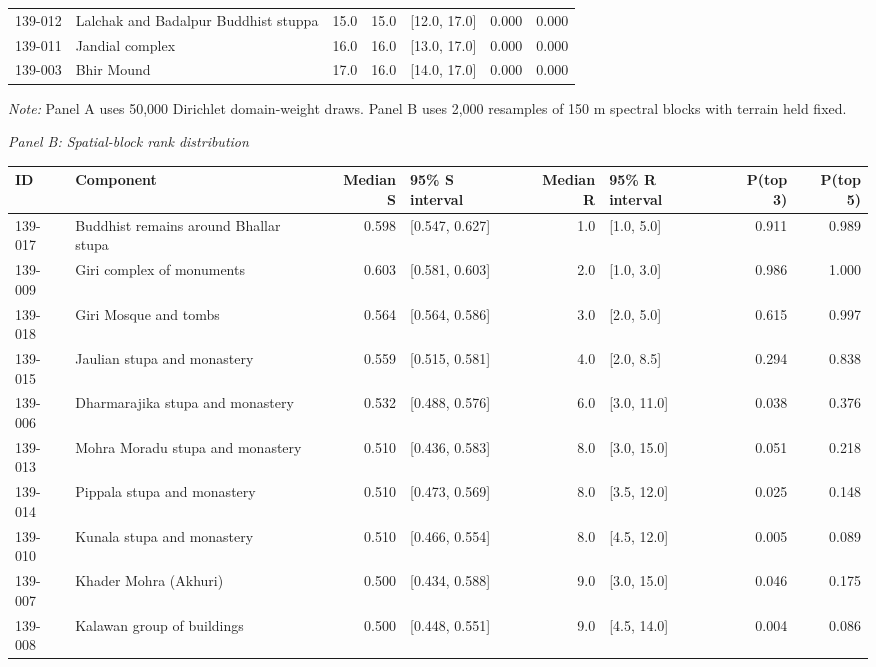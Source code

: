 \begin{landscape}
\begin{longtable}{p{0.09\textwidth}p{0.30\textwidth}rrp{0.14\textwidth}rr}
139-012 & Lalchak and Badalpur Buddhist stuppa & 15.0 & 15.0 & [12.0, 17.0] & 0.000 & 0.000 \\
139-011 & Jandial complex & 16.0 & 16.0 & [13.0, 17.0] & 0.000 & 0.000 \\
139-003 & Bhir Mound & 17.0 & 16.0 & [14.0, 17.0] & 0.000 & 0.000 \\
\end{longtable}
\noindent\textit{Note:} Panel A uses 50,000 Dirichlet domain-weight draws. Panel B uses 2,000 resamples of 150 m spectral blocks with terrain held fixed.
\endgroup
\par\medskip\noindent\textit{Panel B: Spatial-block rank distribution}\par
\begingroup
\scriptsize
\setlength{\tabcolsep}{3pt}
\begin{center}
\begin{adjustbox}{max width=\linewidth}
\begin{tabular}{p{}p{}rp{}rp{}rr}
\toprule
ID & Component & Median S & 95\% S interval & Median R & 95\% R interval & P(top 3) & P(top 5) \\
\midrule
139-017 & Buddhist remains around Bhallar stupa & 0.598 & [0.547, 0.627] & 1.0 & [1.0, 5.0] & 0.911 & 0.989 \\
139-009 & Giri complex of monuments & 0.603 & [0.581, 0.603] & 2.0 & [1.0, 3.0] & 0.986 & 1.000 \\
139-018 & Giri Mosque and tombs & 0.564 & [0.564, 0.586] & 3.0 & [2.0, 5.0] & 0.615 & 0.997 \\
139-015 & Jaulian stupa and monastery & 0.559 & [0.515, 0.581] & 4.0 & [2.0, 8.5] & 0.294 & 0.838 \\
139-006 & Dharmarajika stupa and monastery & 0.532 & [0.488, 0.576] & 6.0 & [3.0, 11.0] & 0.038 & 0.376 \\
139-013 & Mohra Moradu stupa and monastery & 0.510 & [0.436, 0.583] & 8.0 & [3.0, 15.0] & 0.051 & 0.218 \\
139-014 & Pippala stupa and monastery & 0.510 & [0.473, 0.569] & 8.0 & [3.5, 12.0] & 0.025 & 0.148 \\
139-010 & Kunala stupa and monastery & 0.510 & [0.466, 0.554] & 8.0 & [4.5, 12.0] & 0.005 & 0.089 \\
139-007 & Khader Mohra (Akhuri) & 0.500 & [0.434, 0.588] & 9.0 & [3.0, 15.0] & 0.046 & 0.175 \\
139-008 & Kalawan group of buildings & 0.500 & [0.448, 0.551] & 9.0 & [4.5, 14.0] & 0.004 & 0.086 \\

\end{tabular}
\end{adjustbox}
\end{center}
\end{landscape}
